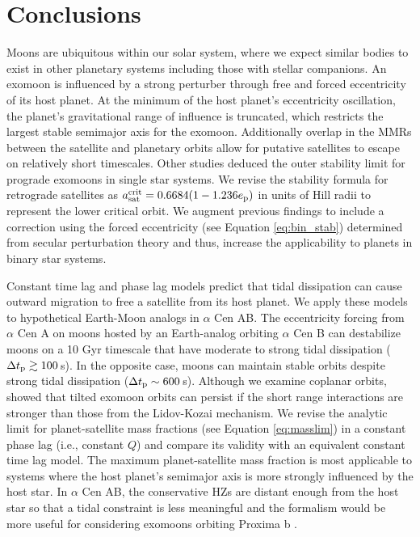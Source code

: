 \documentclass[preprint]{aastex63}
\begin{document}
\section{Conclusions} \label{sec:conclusions}
Moons are ubiquitous within our solar system, where we expect similar bodies to exist in other planetary systems including those with stellar companions.  An exomoon is influenced by a strong perturber through free and forced eccentricity of its host planet.  At the minimum of the host planet's eccentricity oscillation, the planet's gravitational range of influence is truncated, which restricts the largest stable semimajor axis for the exomoon.  Additionally overlap in the MMRs between the satellite and planetary orbits allow for putative satellites to escape on relatively short timescales.  Other studies \citep{Domingos2006,Rosario-Franco2020} deduced the outer stability limit for prograde exomoons in single star systems.  We revise the stability formula for retrograde satellites as $a_{\rm sat}^{\rm crit} = 0.6684(1-1.236e_{\rm p})$ in units of Hill radii to represent the lower critical orbit.  We augment previous findings \citep{Domingos2006,Rosario-Franco2020} to include a correction using the forced eccentricity (see Equation \ref{eq:bin_stab}) determined from secular perturbation theory \citep{andrade2017secular} and thus, increase the applicability to planets in binary star systems.  

Constant time lag \citep{HUT1981} and phase lag \citep{Goldreich1966} models predict that tidal dissipation can cause outward migration to free a satellite from its host planet. We apply these models to hypothetical Earth-Moon analogs in $\alpha$ Cen AB.  The eccentricity forcing from $\alpha$ Cen A on moons hosted by an Earth-analog orbiting $\alpha$ Cen B can destabilize moons on a 10 Gyr timescale that have moderate to strong tidal dissipation ($\Delta t_{\rm p} \gtrsim 100$\,s).  In the opposite case, moons can maintain stable orbits despite strong tidal dissipation ($\Delta t_{\rm p} \sim 600$\,s).  {Although we examine coplanar orbits, \cite{Grishin2018} showed that tilted exomoon orbits can persist if the short range interactions are stronger than those from the Lidov-Kozai mechanism.}  We revise the analytic limit for planet-satellite mass fractions (see Equation \ref{eq:masslim}) in a constant phase lag (i.e., constant $Q$) and compare its validity with an equivalent constant time lag model.  The maximum planet-satellite mass fraction is most applicable to systems where the host planet's semimajor axis is more strongly influenced by the host star.  In $\alpha$ Cen AB, the conservative HZs are distant enough from the host star so that a tidal constraint is less meaningful and the formalism would be more useful for considering exomoons orbiting Proxima b \citep{Anglada-Escude2016}. 
\end{document}
